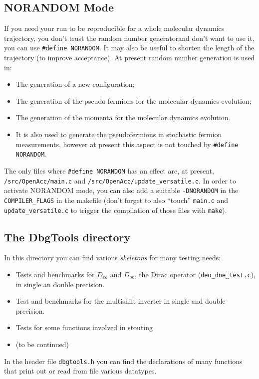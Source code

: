 \subsection{ NORANDOM Mode}
If you need your run to be reproducible for a whole molecular dynamics 
trajectory, you don't trust the random number generatorand don't want to use 
it, you can use
\verb|#define NORANDOM|. It may also be useful to shorten the length of the 
trajectory (to improve acceptance).
At present random number generation is used in:
\begin{itemize}
    \item The generation of a new configuration;
    \item The generation of the pseudo fermions for the molecular dynamics 
        evolution;
    \item The generation of the momenta for the molecular dynamics evolution.
    \item It is also used to generate the pseudofermions in stochastic fermion 
        measurements, however at present this aspect is not touched by 
        \verb|#define NORANDOM|.
\end{itemize}
The only files where \verb|#define NORANDOM| has an effect are, at present, 
\verb|/src/OpenAcc/main.c| and \verb|/src/OpenAcc/update_versatile.c|. In order 
to activate NORANDOM mode, you can also add a suitable \verb|-DNORANDOM| in the 
\verb|COMPILER_FLAGS| in the makefile (don't forget to also ``touch'' 
\verb|main.c| and \verb|update_versatile.c| to trigger the compilation of those 
files with \verb|make|).



\subsection{The DbgTools directory}
In this directory you can find various \emph{skeletons} for many testing needs:
\begin{itemize}
    \item Tests and benchmarks for $D_{eo}$ and $D_{oe}$, the Dirac 
        operator (\verb|deo_doe_test.c|), in single an double precision.
    \item Test and benchmarks for the multishift inverter in single and double 
precision.
    \item Tests for some functions involved in stouting
    \item (to be continued)
\end{itemize}
In the header file \verb|dbgtools.h| you can find the declarations of many 
functions that print out or read from file various datatypes.


